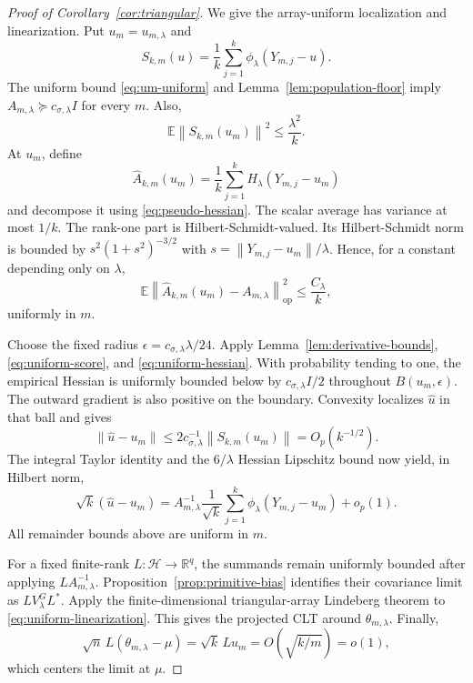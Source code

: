 \documentclass[twoside]{article}
\theoremstyle{definition}
\newcommand{\Hcal}{\mathcal H}
\newcommand{\E}{\mathbb E}
\newcommand{\R}{\mathbb R}
\newcommand{\norm}[1]{\left\lVert #1\right\rVert}
\newcommand{\op}{\mathrm{op}}
\begin{document}
\begin{proof}[Proof of Corollary~\ref{cor:triangular}]
We give the array-uniform localization and linearization. Put $u_m=u_{m,\lambda}$ and
\[
S_{k,m}(u)=\frac1k\sum_{j=1}^k\phi_\lambda(Y_{m,j}-u).
\]
The uniform bound \eqref{eq:um-uniform} and Lemma~\ref{lem:population-floor} imply
$A_{m,\lambda}\succeq c_{\sigma,\lambda}I$ for every $m$. Also,
\begin{equation}\label{eq:uniform-score}
    \E\norm{S_{k,m}(u_m)}^2\le\frac{\lambda^2}{k}.
\end{equation}
At $u_m$, define
\[
    \hat A_{k,m}(u_m)=\frac1k\sum_{j=1}^k
    H_\lambda(Y_{m,j}-u_m)
\]
and decompose it using \eqref{eq:pseudo-hessian}. The scalar average has variance at most $1/k$. The rank-one part is Hilbert-Schmidt-valued. Its Hilbert-Schmidt norm is bounded by
$s^2(1+s^2)^{-3/2}$ with $s=\norm{Y_{m,j}-u_m}/\lambda$. Hence, for a constant depending only on $\lambda$,
\begin{equation}\label{eq:uniform-hessian}
    \E\norm{\hat A_{k,m}(u_m)-A_{m,\lambda}}_{\op}^2
    \le\frac{C_\lambda}{k},
\end{equation}
uniformly in $m$.

Choose the fixed radius $\epsilon=c_{\sigma,\lambda}\lambda/24$. Apply Lemma~\ref{lem:derivative-bounds}, \eqref{eq:uniform-score}, and \eqref{eq:uniform-hessian}. With probability tending to one, the empirical Hessian is uniformly bounded below by $c_{\sigma,\lambda}I/2$ throughout $B(u_m,\epsilon)$. The outward gradient is also positive on the boundary. Convexity localizes $\hat u$ in that ball and gives
\[
    \norm{\hat u-u_m}
    \le2c_{\sigma,\lambda}^{-1}\norm{S_{k,m}(u_m)}
    =O_p(k^{-1/2}).
\]
The integral Taylor identity and the $6/\lambda$ Hessian Lipschitz bound now yield, in Hilbert norm,
\begin{equation}\label{eq:uniform-linearization}
    \sqrt k(\hat u-u_m)
    =A_{m,\lambda}^{-1}\frac1{\sqrt k}\sum_{j=1}^k
      \phi_\lambda(Y_{m,j}-u_m)+o_p(1).
\end{equation}
All remainder bounds above are uniform in $m$.

For a fixed finite-rank $L:\Hcal\to\R^q$, the summands remain uniformly bounded after applying $L A_{m,\lambda}^{-1}$. Proposition~\ref{prop:primitive-bias} identifies their covariance limit as $L V_\lambda^G L^*$. Apply the finite-dimensional triangular-array Lindeberg theorem to \eqref{eq:uniform-linearization}. This gives the projected CLT around $\theta_{m,\lambda}$. Finally,
\[
    \sqrt n\,L(\theta_{m,\lambda}-\mu)
    =\sqrt k\,L u_m
    =O\!\left(\sqrt{k/m}\right)=o(1),
\]
which centers the limit at $\mu$.


\end{proof}
\end{document}
